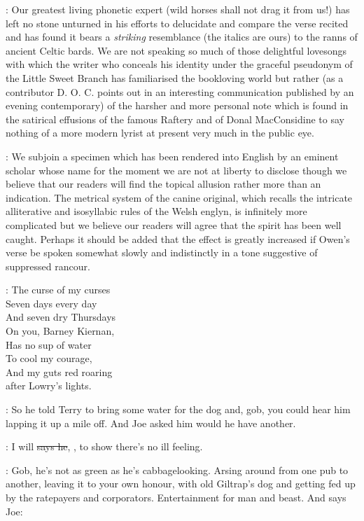 :
Our greatest living
phonetic expert (wild horses shall not drag it from us!) has left no stone
unturned in his efforts to delucidate and compare the verse recited and has
found it bears a \emph{striking} resemblance (the italics are ours) to the ranns
of ancient Celtic bards. We are not speaking so much of those delightful
lovesongs with which the writer who conceals his identity under the
graceful pseudonym of the Little Sweet Branch has familiarised the
bookloving world but rather (as a contributor D. O. C. points out in an
interesting communication published by an evening contemporary) of the
harsher and more personal note which is found in the satirical effusions
of the famous Raftery and of Donal MacConsidine to say nothing of a more
modern lyrist at present very much in the public eye.

:
We subjoin a
specimen which has been rendered into English by an eminent scholar
whose name for the moment we are not at liberty to disclose though
we believe that our readers will find the topical allusion rather
more than an indication. The metrical system of the canine original,
which recalls the intricate alliterative and isosyllabic rules of
the Welsh englyn, is infinitely more complicated but we believe our
readers will agree that the spirit has been well caught. Perhaps
it should be added that the effect is greatly increased if Owen's
verse be spoken somewhat slowly and indistinctly in a tone suggestive
of suppressed rancour.

\garryowen:
    The curse of my curses\\
    Seven days every day\\
    And seven dry Thursdays\\
    On you, Barney Kiernan,\\
    Has no sup of water\\
    To cool my courage,\\
    And my guts red roaring\\
    after Lowry's lights.

\Nq:
So he told Terry to bring some water for the dog and, gob, you could
hear him lapping it up a mile off. And Joe asked him would he have
another.

\citizen:
I will \sout{says he}, ,
to show there's no ill feeling.

\Nq:
Gob, he's not as green as he's cabbagelooking. Arsing around from
one pub to another, leaving it to your own honour, with old Giltrap's dog
and getting fed up by the ratepayers and corporators. Entertainment for
man and beast. And says Joe:

